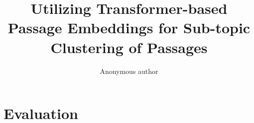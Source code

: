 \documentclass[sigconf,authordraft]{acmart}
\begin{document}
\title{Utilizing Transformer-based Passage Embeddings for Sub-topic Clustering of Passages}


\author{Anonymous author}

\renewcommand{\shortauthors}{}
\maketitle

\section{Evaluation} 
\end{document}
